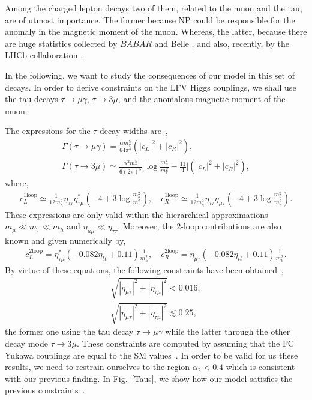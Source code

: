 \documentclass[aps,prd,groupaddress,floatfix,tighten,nofootinbib,showpacs,
amsfonts,superscriptaddress]{revtex4}
\begin{document}
{Among the charged lepton decays two of them, related to the muon and the tau, are of utmost importance. The former because NP could be responsible for the anomaly in the magnetic moment of the muon.  Whereas, the latter, because there are huge statistics collected by $BABAR$ \cite{Aubert:2009ag} and Belle \cite{Miyazaki:2011xe}, and also, recently, by the LHCb collaboration \cite{Aaij:2013fia}.

In the following, we want to study the consequences of our model in this set of decays.  In order to derive constraints on the LFV Higgs couplings, we shall use the tau decays  $\tau \to \mu \gamma$, $\tau \to 3\mu$, and the anomalous magnetic moment of
the muon.

The expressions for the  $\tau$ decay widths are~\cite{Harnik:2012pb},
\begin{eqnarray}
 \Gamma (\tau \to \mu \gamma) = \frac{\alpha m_\tau^5}{64\pi^4} \left( |c_L|^2 + |c_R|^2 \right), \\
 \Gamma (\tau \to  3\mu) \simeq \frac{\alpha^2 m_\tau^5}{6(2\pi)^5}\Bigg| \log \frac{m_\mu^2}{m_\tau^2}  - \frac{11}{4} \Bigg| \left( |c_L|^2 + |c_R|^2 \right),
\end{eqnarray}
where, 
\begin{eqnarray}
	c_L^{\text{1loop}} \simeq  \frac{1}{12m_h^2} \eta_{\tau \tau} \eta^*_{\tau \mu} \left(-4 + 3\log \frac{m_h^2}{m_\tau^2} \right), \quad
		c_R^{\text{1loop}} \simeq  \frac{1}{12m_h^2} \eta_{\tau \tau} \eta_{\mu \tau} \left(-4 + 3\log \frac{m_h^2}{m_\tau^2} \right).
\end{eqnarray}
These expressions are only valid within the hierarchical approximations $m_\mu \ll m_\tau \ll m_h$ and $\eta_{\mu \mu} \ll \eta_{\tau \tau}$. Moreover, the 2-loop contributions are also known and given numerically by,
\begin{eqnarray}
	c_L^{\text{2loop}} = \eta_{\tau \mu}^* (-0.082 \eta_{tt} + 0.11) \frac{1}{m_h^2}, \quad
	c_R^{\text{2loop}} = \eta_{\mu\tau} (-0.082 \eta_{tt} + 0.11) \frac{1}{m_h^2}.
\end{eqnarray}
By virtue of these equations, the following constraints have been obtained~\cite{Harnik:2012pb},
\begin{eqnarray}
	\sqrt{|\eta_{\mu \tau}|^2 + |\eta_{\tau \mu}|^2 } < 0.016, \\
	\sqrt{|\eta_{\mu \tau}|^2 + |\eta_{\tau \mu}|^2 } \lesssim 0.25, 
\end{eqnarray}
the former one using the tau decay $\tau \to \mu \gamma$ while the latter through the other decay mode $\tau \to 3\mu$. These constraints are computed by assuming that the FC Yukawa couplings are equal to the SM values~\cite{Harnik:2012pb}. In order to be valid for us these results, we need to restrain ourselves to the region $\alpha_2 < 0.4$ which is consistent with our previous finding. In 
Fig.~\ref{Taus}, we show how our model satisfies the previous constraints~\cite{Harnik:2012pb}. 

}
\end{document}
